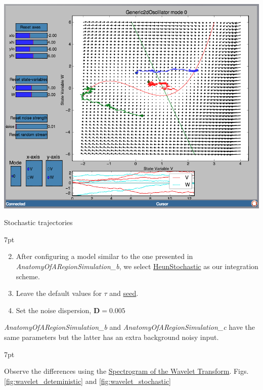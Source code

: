 \documentclass{tufte-handout}
\newenvironment{formal}{%
  \def\FrameCommand{%
    \hspace{1pt}%
    {\color{DarkBlue}\vrule width 2pt}%
    {\color{formalshade}\vrule width 4pt}%
    \colorbox{formalshade}%
  }%
  \MakeFramed{\advance\hsize-\width\FrameRestore}%
  \noindent\hspace{-4.55pt}%
  \begin{adjustwidth}{}{7pt}%
  \vspace{2pt}\vspace{2pt}%
}
{%
  \vspace{2pt}\end{adjustwidth}\endMakeFramed%
}
\newenvironment{simulation}{%
  \def\FrameCommand{%
    \hspace{1pt}%
    {\color{ForestGreen}\vrule width 2pt}%
    {\color{simulationshade}\vrule width 4pt}%
    \colorbox{simulationshade}%
  }%
  \MakeFramed{\advance\hsize-\width\FrameRestore}%
  \noindent\hspace{-4.55pt}%
  \begin{adjustwidth}{}{7pt}%
  \vspace{2pt}\vspace{2pt}%
}
{%
  \vspace{2pt}\end{adjustwidth}\endMakeFramed%
}
\begin{document}
\begin{marginfigure}%
\includegraphics[width=\linewidth]{Handout_UI_BuildingYourOwnBrainNetworkModel_PPI}%
  \caption{Stochastic trajectories}%
  \label{fig:ppi_noise}%
\end{marginfigure}

\begin{simulation}
\begin{enumerate}[resume]
\setcounter{enumi}{1}
\item After configuring a model similar to the one presented in  \textit{AnatomyOfARegionSimulation\_b}, we select \underline{HeunStochastic} as our integration scheme.  
\item Leave the default values for {$\tau$}  and \underline{seed}. 
\item Set the noise dispersion, $\mathbf{D=0.005}$
\end{enumerate}
\end{simulation}
\newpage
\textit{AnatomyOfARegionSimulation\_b} and \textit{AnatomyOfARegionSimulation\_c} have the same parameters but the latter has an extra background noisy input. 

\begin{formal}
\begin{enumerate}
Observe the differences using the \underline{Spectrogram of the Wavelet Transform}. Figs. \ref{fig:wavelet_deteministic} and \ref{fig:wavelet_stochastic}
\end{enumerate}
\end{formal}
\end{document}
